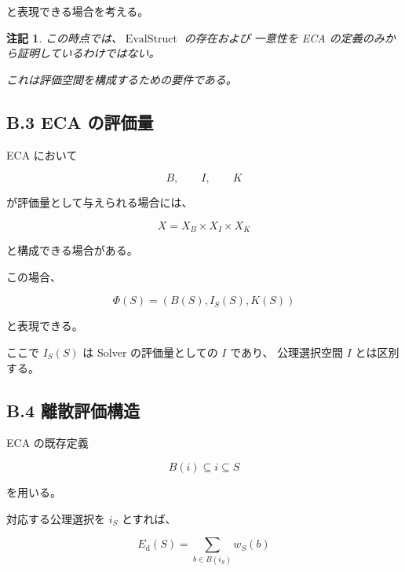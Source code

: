 \documentclass[a4paper,11pt]{article}
\newtheorem{remark}[definition]{注記}
\begin{document}
と表現できる場合を考える。

\begin{remark}
この時点では、$\operatorname{EvalStruct}$ の存在および
一意性を ECA の定義のみから証明しているわけではない。

これは評価空間を構成するための要件である。
\end{remark}


\subsection{B.3 ECA の評価量}

ECA において

\begin{equation}
    B,\qquad I,\qquad K
\end{equation}

が評価量として与えられる場合には、

\begin{equation}
    X
    =
    X_B\times X_I\times X_K
\end{equation}

と構成できる場合がある。

この場合、

\begin{equation}
    \Phi(S)
    =
    \left(
        B(S),I_S(S),K(S)
    \right)
\end{equation}

と表現できる。

ここで $I_S(S)$ は Solver の評価量としての $I$ であり、
公理選択空間 $I$ とは区別する。


\subsection{B.4 離散評価構造}

ECA の既存定義

\begin{equation}
    B(i)\subseteq i\subseteq S
\end{equation}

を用いる。

対応する公理選択を $i_S$ とすれば、

\begin{equation}
    E_{\mathrm d}(S)
    =
    \sum_{b\in B(i_S)}w_S(b)
\end{equation}
\end{document}
